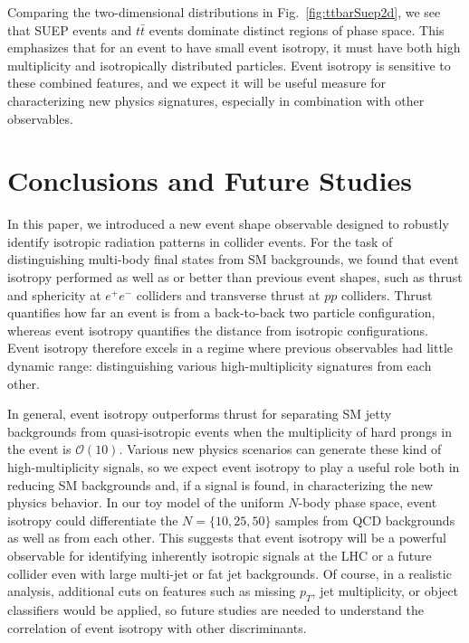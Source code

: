 \documentclass[letterpaper,11pt]{article}
\DeclareRobustCommand{\Fig}[1]{Fig.~\ref{#1}}
\begin{document}
Comparing the two-dimensional distributions in \Fig{fig:ttbarSuep2d}, we see that SUEP events and $t\bar{t}$ events dominate distinct regions of phase space.
%
This emphasizes that for an event to have small event isotropy, it must have both high multiplicity and isotropically distributed particles.
%
Event isotropy is sensitive to these combined features, and we expect it will be useful measure for characterizing new physics signatures, especially in combination with other observables. 


\section{Conclusions and Future Studies}
\label{sec:conclusions}


In this paper, we introduced a new event shape observable designed to robustly identify isotropic radiation patterns in collider events. 
%
For the task of distinguishing multi-body final states from SM backgrounds, we found that event isotropy performed as well as or better than previous event shapes, such as thrust and sphericity at $e^+e^-$ colliders and transverse thrust at $pp$ colliders.
%
Thrust quantifies how far an event is from a back-to-back two particle configuration, whereas event isotropy quantifies the distance from isotropic configurations.
%
Event isotropy therefore excels in a regime where previous observables had little dynamic range:  distinguishing various high-multiplicity signatures from each other.


In general, event isotropy outperforms thrust for separating SM jetty backgrounds from quasi-isotropic events when the multiplicity of hard prongs in the event is $\mathcal{O}(10)$.
%
Various new physics scenarios can generate these kind of high-multiplicity signals, so we expect event isotropy to play a useful role both in reducing SM backgrounds and, if a signal is found, in characterizing the new physics behavior.
%
In our toy model of the uniform $N$-body phase space, event isotropy could differentiate the $N= \{10, 25, 50\}$ samples from QCD backgrounds as well as from each other.
%
This suggests that event isotropy will be a powerful observable for identifying inherently isotropic signals at the LHC or a future collider even with large multi-jet or fat jet backgrounds. 
%
Of course, in a realistic analysis, additional cuts on features such as missing $p_T$, jet multiplicity, or object classifiers would be applied, so future studies are needed to understand the correlation of event isotropy with other discriminants.
\end{document}
